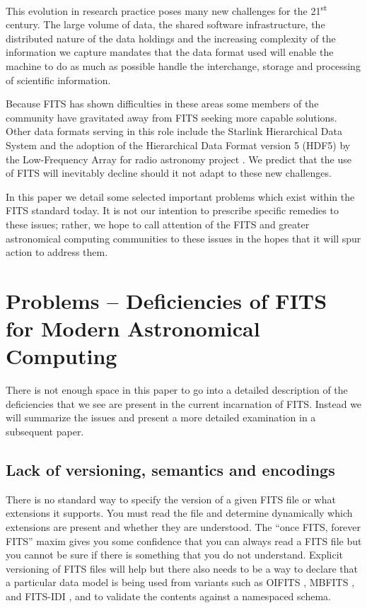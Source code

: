 \documentclass[11pt,twoside]{article}
\begin{document}
This evolution in research practice poses many new challenges for 
the 21\textsuperscript{st} century. The large volume of data, the shared 
software infrastructure, the distributed nature of the data holdings 
and the increasing complexity of the information we capture mandates that 
the data format used will enable the machine to do as much as possible
handle the interchange, storage and processing of scientific information. 

Because FITS has shown difficulties in these areas some members of the community 
have gravitated away from FITS seeking more capable solutions.
Other data formats serving in this role include the Starlink Hierarchical Data System
\citep[HDS;][]{1982QJRAS..23..485D,P91_adassxxiii} and the adoption of the Hierarchical 
Data Format version 5 (HDF5) by the Low-Frequency Array for radio astronomy 
project \citep[LOFAR;][]{2011ASPC..442...53A}.
We predict that the use of FITS will inevitably decline should it not adapt 
to these new challenges.

In this paper we detail some selected important problems which exist 
within the FITS standard today.  It is not our intention to prescribe 
specific remedies to these issues; rather, we hope to call attention 
of the FITS and greater astronomical computing communities to these 
issues in the hopes that it will spur action to address them.

\section{Problems -- Deficiencies of FITS for Modern Astronomical Computing}

There is not enough space in this paper to go into a detailed
description of the deficiencies that we see are present in the current
incarnation of FITS. Instead we will summarize the issues and present
a more detailed examination in a subsequent paper.

\subsection{Lack of versioning, semantics and encodings}

There is no standard way to specify the version of a given FITS file or
what extensions it supports. You must read the file and determine
dynamically which extensions are present and whether they are
understood. The ``once FITS, forever FITS'' maxim gives you some
confidence that you can always read a FITS file but you cannot be sure
if there is something that you do not understand.  Explicit versioning
of FITS files will help but there also needs to be a way to declare that
a particular data model is being used from variants such as OIFITS
\citep{2006SPIE.6268E.106T}, MBFITS \citep{2006A&A...454L..25M}, and
FITS-IDI \citep{2011AIPS114}, and to validate the contents against a
namespaced schema.
\end{document}
